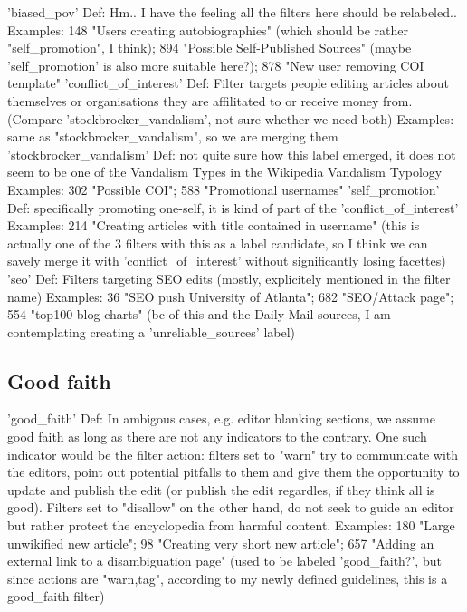 'biased\_pov'
  Def: Hm.. I have the feeling all the filters here should be relabeled..
  Examples: 148 "Users creating autobiographies" (which should be rather "self\_promotion", I think); 894 "Possible Self-Published Sources" (maybe 'self\_promotion' is also more suitable here?); 878 "New user removing COI template"
'conflict\_of\_interest'
  Def: Filter targets people editing articles about themselves or organisations they are affilitated to or receive money from. (Compare 'stockbrocker\_vandalism', not sure whether we need both)
  Examples: same as "stockbrocker\_vandalism", so we are merging them
'stockbrocker\_vandalism'
  Def: not quite sure how this label emerged, it does not seem to be one of the Vandalism Types in the Wikipedia Vandalism Typology %
  Examples: 302 "Possible COI"; 588 "Promotional usernames"
'self\_promotion'
  Def: specifically promoting one-self, it is kind of part of the 'conflict\_of\_interest'
  Examples: 214 "Creating articles with title contained in username" (this is actually one of the 3 filters with this as a label candidate, so I think we can savely merge it with 'conflict\_of\_interest' without significantly losing facettes)
'seo'
  Def: Filters targeting SEO edits (mostly, explicitely mentioned in the filter name)
  Examples: 36 "SEO push University of Atlanta"; 682 "SEO/Attack page"; 554 "top100 blog charts" (bc of this and the Daily Mail sources, I am contemplating creating a 'unreliable\_sources' label)

\subsection{Good faith}

'good\_faith'
  Def: In ambigous cases, e.g. editor blanking sections, we assume good faith as long as there are not any indicators to the contrary. One such indicator would be the filter action: filters set to "warn" try to communicate with the editors, point out potential pitfalls to them and give them the opportunity to update and publish the edit (or publish the edit regardles, if they think all is good). Filters set to "disallow" on the other hand, do not seek to guide an editor but rather protect the encyclopedia from harmful content.
  Examples: 180	"Large unwikified new article"; 98 "Creating very short new article"; 657 "Adding an external link to a disambiguation page" (used to be labeled 'good\_faith?', but since actions are "warn,tag", according to my newly defined guidelines, this is a good\_faith filter)

